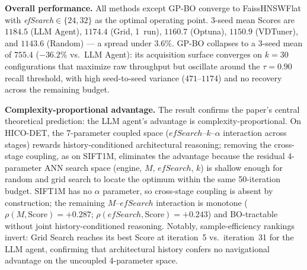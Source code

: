\documentclass[sigconf, nonacm]{acmart}
\theoremstyle{definition}
\begin{document}
\begin{table}[t]
\centering
\caption{Optimizer comparison on SIFT1M (1M vectors, 10K queries, 50 iters, 3-seed means; Grid: 1~run; Score\,$=$\,QPS if Recall@10\,$\geq 0.90$).}
\label{tab:sift1m}
\end{table}

\noindent\textbf{Overall performance.}
All methods except GP-BO converge to FaissHNSWFlat with \textit{efSearch}$\in\{24,32\}$
as the optimal operating point. 3-seed mean Scores are
$\mathbf{1184.5}$ (LLM Agent), $1174.4$ (Grid, 1~run), $1160.7$ (Optuna), $1150.9$ (VDTuner), and $1143.6$ (Random) ---
a spread under $3.6\%$.
GP-BO collapses to a 3-seed mean of $755.4$ ($-36.2\%$ vs.\ LLM Agent): its acquisition surface
converges on $k{=}30$ configurations that maximize raw throughput but oscillate around
the $\tau{=}0.90$ recall threshold, with high seed-to-seed variance ($471$--$1174$) and
no recovery across the remaining budget.

\noindent\textbf{Complexity-proportional advantage.}
The result confirms the paper's central theoretical prediction: the LLM agent's
advantage is complexity-proportional.
On HICO-DET, the 7-parameter coupled space ($\mathit{efSearch}$--$k$--$\alpha$
interaction across stages) rewards history-conditioned architectural reasoning;
removing the cross-stage coupling, as on SIFT1M, eliminates the advantage because
the residual 4-parameter ANN search space (engine, $M$, $\mathit{efSearch}$, $k$)
is shallow enough for random and grid search to locate the optimum within the same
50-iteration budget.
SIFT1M has no $\alpha$ parameter, so cross-stage coupling is absent by
construction; the remaining $M$--$\mathit{efSearch}$ interaction is monotone
($\rho(M,\text{Score}){=}{+}0.287$; $\rho(\mathit{efSearch},\text{Score}){=}{+}0.243$)
and BO-tractable without joint history-conditioned reasoning.
Notably, sample-efficiency rankings invert: Grid Search reaches its best Score at iteration~5 vs.\ iteration~31 for the LLM agent, confirming that architectural history confers no navigational advantage on the uncoupled 4-parameter space.
\end{document}
